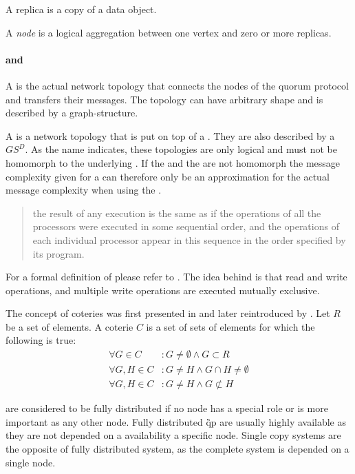 \documentclass[conference]{IEEEtran}
\begin{document}
A replica is a copy of a data object.

A \emph{node} is a logical aggregation between one vertex and zero or more
replicas.

\paragraph{ and }
A  is the actual network topology that connects the nodes of the quorum
protocol and transfers their messages.
The topology can have arbitrary shape and is described by a graph-structure.

A  is a network topology that is put on top of a .
They are also described by a \(GS^{D}\).
As the name indicates, these topologies are only logical and must not be
homomorph to the underlying .
If the  and the  are not homomorph the message complexity given
for a  can therefore only be an approximation for the actual message
complexity when using the .

\begin{quote}
the result of any execution is the same as if the operations of all the
processors were executed in some sequential order, and the operations of
each individual processor appear in this sequence in the order specified by
its program. \cite{Lam79:hmm}
\end{quote}
For a formal definition of  please refer to
\cite{BHG87:ccr,Lam79:hmm}.
The idea behind  is that read and write operations, and multiple write
operations are executed mutually exclusive.

The concept of coteries was first presented in \cite{Lam78:ird} and later
reintroduced by \cite{GB85:hav}.
Let \(R\) be a set of elements.
A coterie \(C\) is a set of sets of elements for which the following is true:
\begin{align}
	\forall G \in C &: G \ne \emptyset \wedge G \subset R \\
	\forall G,H \in C &: G \ne H \wedge G \cap H \ne \emptyset \\
	\forall G,H \in C &: G \ne H \wedge G \not\subset H
\end{align}

 are considered to be fully distributed if no node has a special role or
is more important as any other node.
Fully distributed \G{qp} are usually highly available as they are not depended
on a availability a specific node.
Single copy systems are the opposite of fully distributed system, as the
complete system is depended on a single node.
\end{document}
